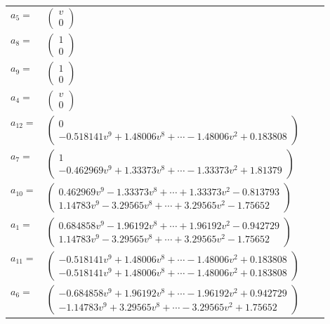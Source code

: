 \documentclass[1p]{elsarticle_modified}
\theoremstyle{definition}
\begin{document}
\begin{tabular}{m{7pt} m{180pt} m{7pt} m{180pt} }
\flushright $a_{5}=$&$\begin{pmatrix}v\\0\end{pmatrix}$ \\
\flushright $a_{8}=$&$\begin{pmatrix}1\\0\end{pmatrix}$ \\
\flushright $a_{9}=$&$\begin{pmatrix}1\\0\end{pmatrix}$ \\
\flushright $a_{4}=$&$\begin{pmatrix}v\\0\end{pmatrix}$ \\
\flushright $a_{12}=$&$\begin{pmatrix}0\\-0.518141 v^{9}+1.48006 v^{8}+\cdots-1.48006 v^{2}+0.183808\end{pmatrix}$ \\
\flushright $a_{7}=$&$\begin{pmatrix}1\\-0.462969 v^{9}+1.33373 v^{8}+\cdots-1.33373 v^{2}+1.81379\end{pmatrix}$ \\
\flushright $a_{10}=$&$\begin{pmatrix}0.462969 v^{9}-1.33373 v^{8}+\cdots+1.33373 v^{2}-0.813793\\1.14783 v^{9}-3.29565 v^{8}+\cdots+3.29565 v^{2}-1.75652\end{pmatrix}$ \\
\flushright $a_{1}=$&$\begin{pmatrix}0.684858 v^{9}-1.96192 v^{8}+\cdots+1.96192 v^{2}-0.942729\\1.14783 v^{9}-3.29565 v^{8}+\cdots+3.29565 v^{2}-1.75652\end{pmatrix}$ \\
\flushright $a_{11}=$&$\begin{pmatrix}-0.518141 v^{9}+1.48006 v^{8}+\cdots-1.48006 v^{2}+0.183808\\-0.518141 v^{9}+1.48006 v^{8}+\cdots-1.48006 v^{2}+0.183808\end{pmatrix}$ \\
\flushright $a_{6}=$&$\begin{pmatrix}-0.684858 v^{9}+1.96192 v^{8}+\cdots-1.96192 v^{2}+0.942729\\-1.14783 v^{9}+3.29565 v^{8}+\cdots-3.29565 v^{2}+1.75652\end{pmatrix}$ \\

\end{tabular}
\end{document}
